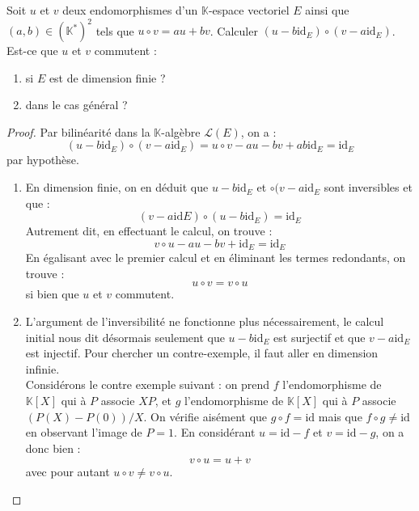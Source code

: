 \documentclass[french,a4paper]{article}
\newcommand{\K}{\mathbb{K}}
\newcommand{\st}{^*}
\theoremstyle{plain}
\theoremstyle{definition}
\theoremstyle{remark}
\begin{document}
\begin{ex}[Moulin.EV.43]{}
	Soit $u$ et $v$ deux endomorphismes d'un $\K$-espace vectoriel $E$ ainsi que $(a,b)\in(\K\st)^2$ tels que $u\circ v=au+bv$. Calculer $(u-b\text{id}_E)\circ(v-a\text{id}_E)$. Est-ce que $u$ et $v$ commutent :
	\begin{enumerate}
		\item si $E$ est de dimension finie ?
		\item dans le cas général ?
	\end{enumerate}
\end{ex}
\begin{proof}
	Par bilinéarité dans la $\K$-algèbre $\mathcal{L}(E)$, on a : $$(u-b\text{id}_E)\circ(v-a\text{id}_E)=u\circ v-au-bv+ab\text{id}_E=\text{id}_E$$ par hypothèse.
	\begin{enumerate}
		\item En dimension finie, on en déduit que $u-b\text{id}_E$ et $\circ(v-a\text{id}_E$ sont inversibles et que : $$(v-a\text{id}E)\circ(u-b\text{id}_E)=\text{id}_E$$ Autrement dit, en effectuant le calcul, on trouve : $$v\circ u-au-bv+\text{id}_E=\text{id}_E$$ En égalisant avec le premier calcul et en éliminant les termes redondants, on trouve : $$u\circ v=v\circ u$$ si bien que $u$ et $v$ commutent.
		\item L'argument de l'inversibilité ne fonctionne plus nécessairement, le calcul initial nous dit désormais seulement que $u-b\text{id}_E$ est surjectif et que $v-a\text{id}_E$ est injectif. Pour chercher un contre-exemple, il faut aller en dimension infinie.\\
		Considérons le contre exemple suivant : on prend $f$ l'endomorphisme de $\K[X]$ qui à $P$ associe $XP$, et $g$ l'endomorphisme de $\K[X]$ qui à $P$ associe $(P(X)-P(0))/X$. On vérifie aisément que $g\circ f=\text{id}$ mais que $f\circ g\ne\text{id}$ en observant l'image de $P=1$. En considérant $u=\text{id}-f$ et $v=\text{id}-g$, on a donc bien : $$v\circ u=u+v$$ avec pour autant $u\circ v\ne v\circ u$.
	\end{enumerate}
\end{proof}
\end{document}
